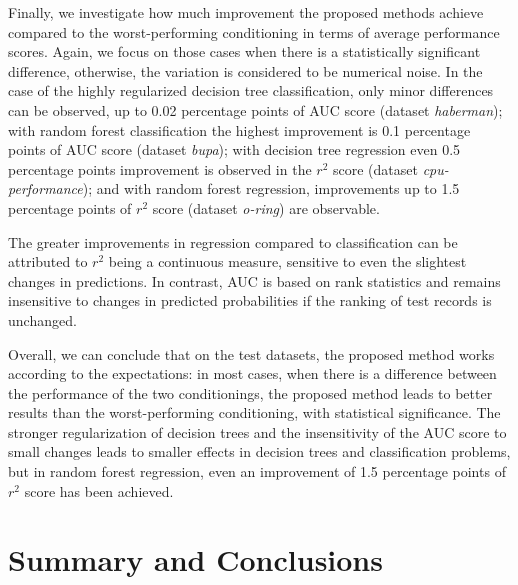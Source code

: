 \documentclass[sn-mathphys]{sn-jnl}%
\theoremstyle{thmstyleone}%
\theoremstyle{thmstyletwo}%
\theoremstyle{thmstylethree}%
\begin{document}
Finally, we investigate how much improvement the proposed methods achieve compared to the worst-performing conditioning in terms of average performance scores. Again, we focus on those cases when there is a statistically significant difference, otherwise, the variation is considered to be numerical noise. In the case of the highly regularized decision tree classification, only minor differences can be observed, up to 0.02 percentage points of AUC score (dataset \emph{haberman}); with random forest classification the highest improvement is 0.1 percentage points of AUC score (dataset \emph{bupa}); with decision tree regression even 0.5 percentage points improvement is observed in the $r^2$ score (dataset \emph{cpu-performance}); and with random forest regression, improvements up to 1.5 percentage points of $r^2$ score (dataset \emph{o-ring}) are observable. 

The greater improvements in regression compared to classification can be attributed to $r^2$ being a continuous measure, sensitive to even the slightest changes in predictions. In contrast, AUC is based on rank statistics and remains insensitive to changes in predicted probabilities if the ranking of test records is unchanged.

Overall, we can conclude that on the test datasets, the proposed method works according to the expectations: in most cases, when there is a difference between the performance of the two conditionings, the proposed method leads to better results than the worst-performing conditioning, with statistical significance. The stronger regularization of decision trees and the insensitivity of the AUC score to small changes leads to smaller effects in decision trees and classification problems, but in random forest regression, even an improvement of 1.5 percentage points of $r^2$ score has been achieved.

\section{Summary and Conclusions}
\label{sec:summary}
\end{document}
